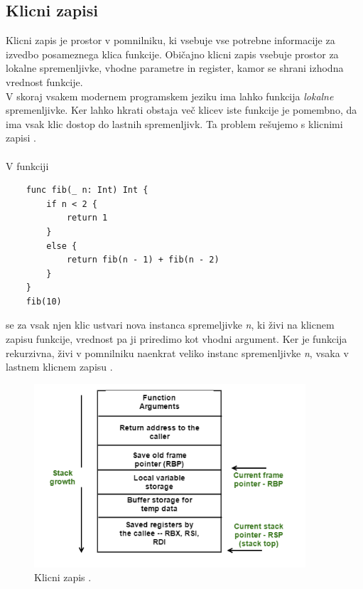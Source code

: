 \documentclass[a4paper, 12p]{book}
\begin{document}
\subsection{Klicni zapisi}

Klicni zapis je prostor v pomnilniku, ki vsebuje vse potrebne informacije za izvedbo posameznega klica funkcije. Običajno klicni zapis vsebuje prostor za lokalne spremenljivke, vhodne parametre in register, kamor se shrani izhodna vrednost funkcije. \\
\indent V skoraj vsakem modernem programskem jeziku ima lahko funkcija \textit{lokalne} spremenljivke. Ker lahko hkrati obstaja več klicev iste funkcije je pomembno, da ima vsak klic dostop do lastnih spremenljivk. Ta problem rešujemo s klicnimi zapisi \cite{modernCompiler}.  \\\\
\indent V funkciji 

\renewcommand{\lstlistingname}{Program}
\begin{lstlisting}
	func fib(_ n: Int) Int {
	    if n < 2 {
	        return 1
	    }
	    else {
	        return fib(n - 1) + fib(n - 2)
	    }
	}
	fib(10)
\end{lstlisting}

se za vsak njen klic ustvari nova instanca spremeljivke \textit{n}, ki živi na klicnem zapisu funkcije, vrednost pa ji priredimo kot vhodni argument. Ker je funkcija rekurzivna, živi v pomnilniku naenkrat veliko instanc spremenljivke \textit{n}, vsaka v lastnem klicnem zapisu \cite{modernCompiler}.

\begin{figure}[h]
	\begin{center}
		\includegraphics[width=0.9\textwidth]{resources/stackFrame.png}
	\end{center}
	\caption{Klicni zapis \cite{stackFrames}.}
	\label{image:stackFramesImg}
\end{figure}
\end{document}
